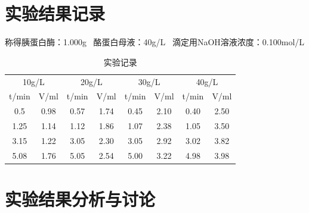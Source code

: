 \documentclass[UTF8]{ctexart}
\begin{document}
	\section{实验结果记录}
	称得胰蛋白酶：1.000g  \ 酪蛋白母液：40g/L \  滴定用NaOH溶液浓度：0.100mol/L
        \begin{table}[H]
        \centering
        \begin{tabular}{cccccccc}
        \toprule
        \multicolumn{2}{c}{10g/L} & \multicolumn{2}{c}{20g/L} & \multicolumn{2}{c}{30g/L} & \multicolumn{2}{c}{40g/L} \\
        \cmidrule(r){1-2} \cmidrule(lr){3-4} \cmidrule(lr){5-6} \cmidrule(l){7-8}
        t/min & V/ml & t/min & V/ml & t/min & V/ml & t/min & V/ml \\
        \midrule
        0.5 & 0.98 & 0.57 & 1.74 & 0.45 & 2.10 & 0.40 & 2.50 \\
        1.25 & 1.14 & 1.12 & 1.86 & 1.07 & 2.38 & 1.05 & 3.50 \\
        3.15 & 1.22 & 3.05 & 2.30 & 3.05 & 2.92 & 3.02 & 3.82 \\
        5.08 & 1.76 & 5.05 & 2.54 & 5.00 & 3.22 & 4.98 & 3.98 \\
        \bottomrule
        \end{tabular}
        \caption{实验记录}
        \end{table}
		
	\section{实验结果分析与讨论}
\end{document}
